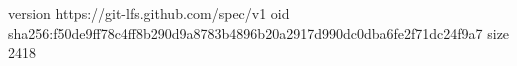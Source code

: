 version https://git-lfs.github.com/spec/v1
oid sha256:f50de9ff78c4ff8b290d9a8783b4896b20a2917d990dc0dba6fe2f71dc24f9a7
size 2418
